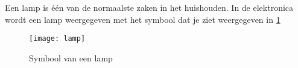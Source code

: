 Een lamp is \'e\'en van de normaalste zaken in het huishouden. In de elektronica wordt een lamp weergegeven met het symbool dat je ziet weergegeven in \ref{symbool:lamp}

\begin{figure}[h]
\texttt{[image: lamp]}
\centering
\caption{Symbool van een lamp}
\label{symbool:lamp}
\end{figure}
